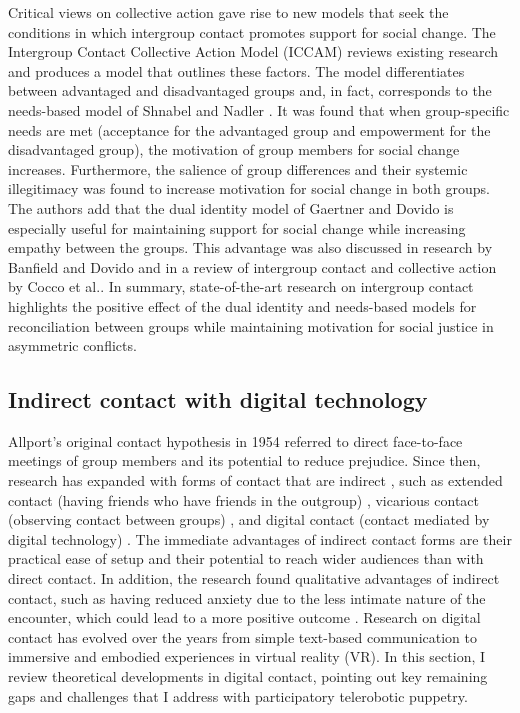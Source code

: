 \documentclass[dissertation,math,vertlayout,pdfa,colorlinks,nologo]{aaltoseries}
\begin{document}
Critical views on collective action gave rise to new models that seek the conditions in which intergroup contact promotes support for social change. The Intergroup Contact Collective Action Model (ICCAM)\cite{hasslerIntergroupContactSocial2021} reviews existing research and produces a model that outlines these factors. The model differentiates between advantaged and disadvantaged groups and, in fact, corresponds to the needs-based model of Shnabel and Nadler \cite{hasslerNeedSatisfactionIntergroup2022,shnabelChapterFourNeedsbased2023}. It was found that when group-specific needs are met (acceptance for the advantaged group and empowerment for the disadvantaged group), the motivation of group members for social change increases. Furthermore, the salience of group differences and their systemic illegitimacy was found to increase motivation for social change in both groups. The authors add that the dual identity model of Gaertner and Dovido is especially useful for maintaining support for social change while increasing empathy between the groups. This advantage was also discussed in research by Banfield and Dovido \cite{banfieldWhitesPerceptionsDiscrimination2013} and in a review of intergroup contact and collective action by Cocco et al.\cite{coccoMobilizingSedativeEffects2024}. In summary, state-of-the-art research on intergroup contact highlights the positive effect of the dual identity and needs-based models for reconciliation between groups while maintaining motivation for social justice in asymmetric conflicts.

\subsection{Indirect contact with digital technology}
\label{sec:indirect_contact}
Allport's original contact hypothesis in 1954 \cite{allportNaturePrejudice1954} referred to direct face-to-face meetings of group members and its potential to reduce prejudice. Since then, research has expanded with forms of contact that are indirect \cite{whiteDirectContactTheoretical2021}, such as extended contact (having friends who have friends in the outgroup) \cite{wrightExtendedContactEffect1997,zhouExtendedContactHypothesis2019}, vicarious contact (observing contact between groups) \cite{gomezVicariousIntergroupContact2008,vezzaliImprovingIntergroupRelations2014}, and digital contact (contact mediated by digital technology) \cite{pereiradacostaDoesDigitalIntergroup2024}. The immediate advantages of indirect contact forms are their practical ease of setup and their potential to reach wider audiences than with direct contact. In addition, the research found qualitative advantages of indirect contact, such as having reduced anxiety due to the less intimate nature of the encounter, which could lead to a more positive outcome \cite{whiteDirectContactTheoretical2021}. Research on digital contact has evolved over the years from simple text-based communication to immersive and embodied experiences in virtual reality (VR). In this section, I review theoretical developments in digital contact, pointing out key remaining gaps and challenges that I address with participatory telerobotic puppetry.
\end{document}
